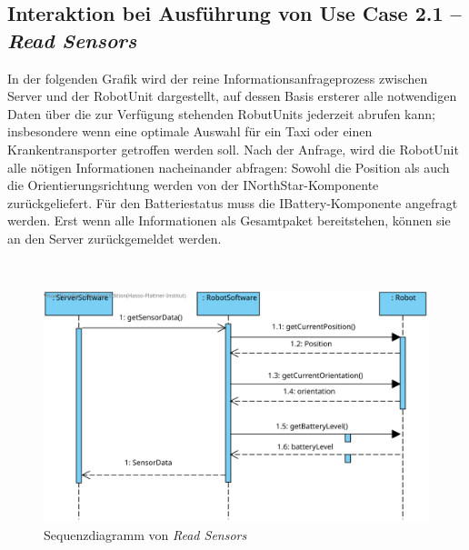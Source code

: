 	\subsection*{Interaktion bei Ausführung von Use Case 2.1 – \emph{Read Sensors}}
In der folgenden Grafik wird der reine Informationsanfrageprozess zwischen Server und der RobotUnit dargestellt, auf dessen Basis ersterer alle notwendigen Daten über die zur Verfügung stehenden RobutUnits jederzeit abrufen kann; insbesondere wenn eine optimale Auswahl für ein Taxi oder einen Krankentransporter getroffen werden soll. 
Nach der Anfrage, wird die RobotUnit alle nötigen Informationen nacheinander abfragen: Sowohl die Position als auch die Orientierungsrichtung werden von der INorthStar-Komponente zurückgeliefert. 
Für den Batteriestatus muss die IBattery-Komponente angefragt werden. 
Erst wenn alle Informationen als Gesamtpaket bereitstehen, können sie an den Server zurückgemeldet werden.

\\

	\begin{figure}[H]
		\centering
		\includegraphics[width=1\textwidth]{img/0-Entwurf-8-ReadSens}
		\caption{Sequenzdiagramm von \emph{Read Sensors}}
		\label{ReadSensors}
	\end{figure}

	
